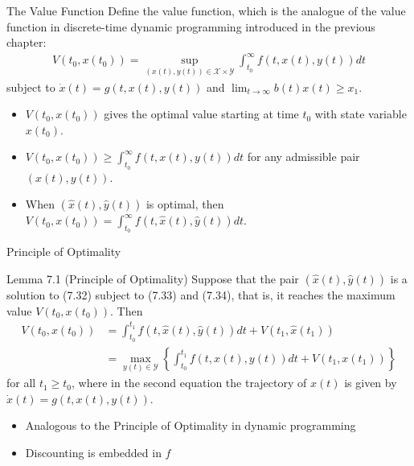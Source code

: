 \documentclass[9pt,aspectratio=169]{beamer}
\newcommand{\X}{\mathcal{X}}
\newcommand{\Y}{\mathcal{Y}}
\begin{document}
\begin{frame}{The Value Function}
    Define the value function, which is the analogue of the value function in
    discrete-time dynamic programming introduced in the previous chapter:
    \begin{align}
        V(t_0, x(t_0)) = \sup_{(x(t),y(t)) \in \X \times \Y}
        \int_{t_0}^{\infty} f(t, x(t), y(t))dt \tag{7.35}
    \end{align}
    subject to $\dot{x}(t) = g(t, x(t), y(t))$ and $\lim_{t \to \infty} b(t)x(t) \geq x_1$.
    \begin{itemize}
        \item $V(t_0, x(t_0))$ gives the optimal value starting at time $t_0$
        with state variable $x(t_0)$.
        \item $V(t_0, x(t_0)) \geq \int_{t_0}^{\infty} f(t, x(t), y(t))dt$
        for any admissible pair $(x(t), y(t))$.
        \item When $(\hat{x}(t), \hat{y}(t))$ is optimal, then $V(t_0,
        x(t_0)) = \int_{t_0}^{\infty} f(t, \hat{x}(t), \hat{y}(t))dt$.
    \end{itemize}
\end{frame}

\begin{frame}{Principle of Optimality}
    \begin{block}{Lemma 7.1 (Principle of Optimality)}
        Suppose that the pair $(\hat{x}(t), \hat{y}(t))$ is a solution to
        (7.32) subject to (7.33) and (7.34), that is, it reaches the maximum
        value $V(t_0, x(t_0))$. Then
        \begin{align}
            V(t_0, x(t_0)) &= \int_{t_0}^{t_1} f(t, \hat{x}(t), \hat{y}(t))dt
            + V(t_1, \hat{x}(t_1)) \tag{7.38}\\
            \nonumber &= \max_{y(t) \in \Y} \left\{ \int_{t_0}^{t_1} f(t,
                x(t), y(t))dt + V(t_1, x(t_1)) \right\}
        \end{align}
        for all $t_1 \geq t_0$, where in the second equation the trajectory
        of $x(t)$ is given by $\dot x(t) = g(t, x(t), y(t))$.
    \end{block}
    \begin{itemize}
        \item Analogous to the Principle of Optimality in dynamic programming
        \item Discounting is embedded in $f$
    \end{itemize}
\end{frame}
\end{document}
